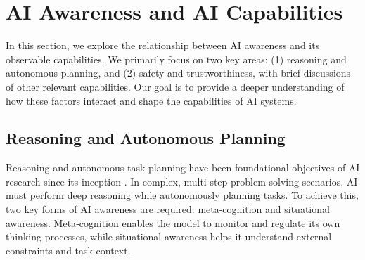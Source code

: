 \section{AI Awareness and AI Capabilities}
\label{sec:opportunity}

In this section, we explore the relationship between AI awareness and its observable capabilities. We primarily focus on two key areas: (1) reasoning and autonomous planning, and (2) safety and trustworthiness, with brief discussions of other relevant capabilities. Our goal is to provide a deeper understanding of how these factors interact and shape the capabilities of AI systems.




\subsection{Reasoning and Autonomous Planning}

Reasoning and autonomous task planning have been foundational objectives of AI research since its inception \citep{ghallab2004automated}.
In complex, multi-step problem-solving scenarios, AI must perform deep reasoning while autonomously planning tasks. To achieve this, two key forms of AI awareness are required: meta‑cognition and situational awareness. Meta‑cognition enables the model to monitor and regulate its own thinking processes, while situational awareness helps it understand external constraints and task context. 


